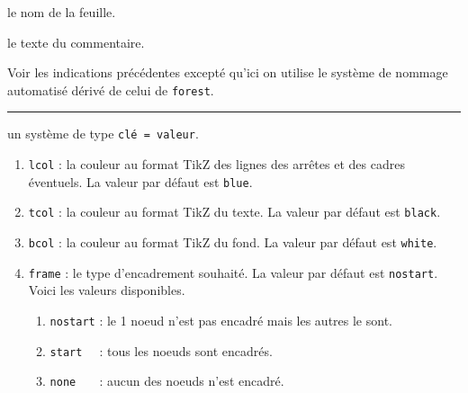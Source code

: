\documentclass[12pt,a4paper]{article}
\theoremstyle{definition}
\newcommand\separation{
    \medskip
    \hfill\rule{0.5\textwidth}{0.75pt}\hfill
    \medskip
}
\newcommand\extraspace{
    \vspace{0.25em}
}
\begin{document}

 le nom de la feuille.

 le texte du commentaire.


\bigskip




\extraspace
\extraspace

Voir les indications précédentes excepté qu'ici on utilise le système de nommage automatisé dérivé de celui de \verb#forest#.





\separation



\IDoption{} un système de type \texttt{clé = valeur}.

\begin{enumerate}    
    \item \verb#lcol# : la couleur au format TikZ des lignes des arrêtes et des cadres éventuels. La valeur par défaut est \verb#blue#.

    \item \verb#tcol# : la couleur au format TikZ du texte. La valeur par défaut est \verb#black#.

    \item \verb#bcol# : la couleur au format TikZ du fond. La valeur par défaut est \verb#white#.
    
    \extraspace
    
    \item \verb#frame# : le type d'encadrement souhaité. La valeur par défaut est \verb#nostart#. Voici les valeurs disponibles.
    \begin{enumerate}
    	\item \verb#nostart# : le 1\ier{} noeud n'est pas encadré mais les autres le sont.

    	\item \verb#start  # : tous les noeuds sont encadrés. 

    	\item \verb#none   # : aucun des noeuds n'est encadré.
    \end{enumerate}
\end{enumerate}
\end{document}
